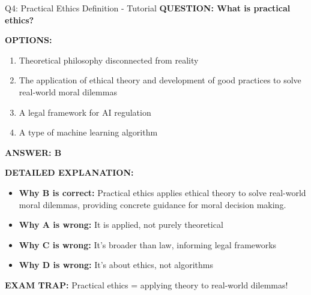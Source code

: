 \documentclass[8pt]{beamer}
\begin{document}
	\begin{frame}{Q4: Practical Ethics Definition - Tutorial}
		\fontsize{6.5}{7.5}\selectfont
		\textbf{QUESTION: What is practical ethics?}
		
		\vspace{0.1cm}
		\textbf{OPTIONS:}
		\begin{enumerate}
			\item Theoretical philosophy disconnected from reality
			\item The application of ethical theory and development of good practices to solve real-world moral dilemmas
			\item A legal framework for AI regulation
			\item A type of machine learning algorithm
		\end{enumerate}
		
		\vspace{0.1cm}
		\textcolor{myblue}{\textbf{ANSWER: B}}
		
		\vspace{0.1cm}
		\textbf{DETAILED EXPLANATION:}
		\begin{itemize}
			\item \textbf{Why B is correct:} Practical ethics applies ethical theory to solve real-world moral dilemmas, providing concrete guidance for moral decision making.
			\item \textbf{Why A is wrong:} It is applied, not purely theoretical
			\item \textbf{Why C is wrong:} It's broader than law, informing legal frameworks
			\item \textbf{Why D is wrong:} It's about ethics, not algorithms
		\end{itemize}
		
		\textcolor{myred}{\textbf{EXAM TRAP:}} Practical ethics = \textcolor{myblue}{applying theory to real-world dilemmas}!
	\end{frame}
	
\end{document}
